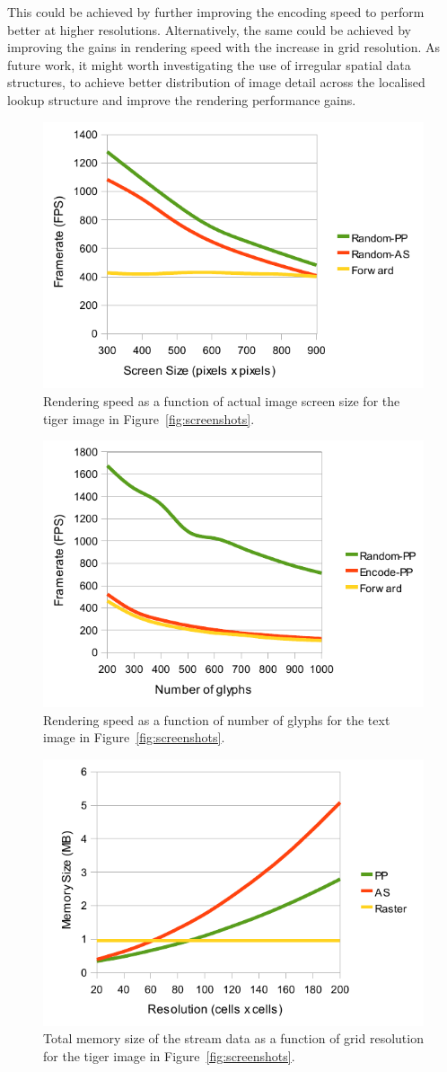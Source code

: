 \documentclass[11pt,a4paper,twoside]{article}
\begin{document}
This could be achieved by further improving the encoding speed to perform better at higher resolutions. Alternatively, the same could be achieved by improving the gains in rendering speed with the increase in grid resolution. As future work, it might worth investigating the use of irregular spatial data structures, to achieve better distribution of image detail across the localised lookup structure and improve the rendering performance gains.

\begin {figure} [p]
	\centering
	\includegraphics[width=0.5\columnwidth] {figures/graph_size_render}
	\caption {Rendering speed as a function of actual image screen size for the tiger image in Figure~\ref{fig:screenshots}.}
	\label {fig:graph_size_render}
\end {figure}

\begin {figure} [p]
	\centering
	\includegraphics[width=0.5\columnwidth] {figures/graph_glyphs_render}
	\caption {Rendering speed as a function of number of glyphs for the text image in Figure~\ref{fig:screenshots}.}
	\label {fig:graph_glyphs_render}
\end {figure}

\begin {figure} [p]
	\centering
	\includegraphics[width=0.55\columnwidth] {figures/graph_grid_memory}
	\caption {Total memory size of the stream data as a function of grid resolution for the tiger image in Figure~\ref{fig:screenshots}.}
	\label {fig:graph_grid_memory}
\end {figure}
\end{document}
